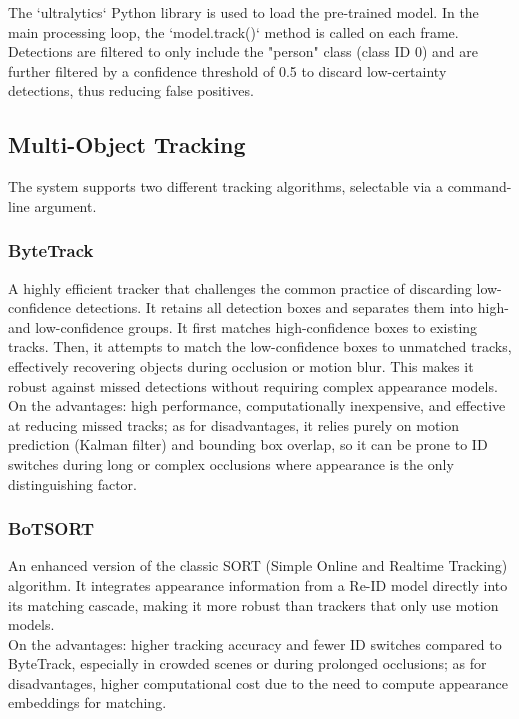 \documentclass[11pt, a4paper]{article}
\begin{document}
The `ultralytics` Python library is used to load the pre-trained model. In the main processing loop, the `model.track()` method is called on each frame. Detections are filtered to only include the "person" class (class ID 0) and are further filtered by a confidence threshold of 0.5 to discard low-certainty detections, thus reducing false positives.

\subsection{Multi-Object Tracking}
The system supports two different tracking algorithms, selectable via a command-line argument.
\subsubsection{ByteTrack}
A highly efficient tracker that challenges the common practice of discarding low-confidence detections. It retains all detection boxes and separates them into high- and low-confidence groups. It first matches high-confidence boxes to existing tracks. Then, it attempts to match the low-confidence boxes to unmatched tracks, effectively recovering objects during occlusion or motion blur. This makes it robust against missed detections without requiring complex appearance models.\\

On the advantages: high performance, computationally inexpensive, and effective at reducing missed tracks; as for disadvantages, it relies purely on motion prediction (Kalman filter) and bounding box overlap, so it can be prone to ID switches during long or complex occlusions where appearance is the only distinguishing factor.

\subsubsection{BoTSORT}
An enhanced version of the classic SORT (Simple Online and Realtime Tracking) algorithm. It integrates appearance information from a Re-ID model directly into its matching cascade, making it more robust than trackers that only use motion models.\\

On the advantages: higher tracking accuracy and fewer ID switches compared to ByteTrack, especially in crowded scenes or during prolonged occlusions; as for disadvantages, higher computational cost due to the need to compute appearance embeddings for matching.
\end{document}
